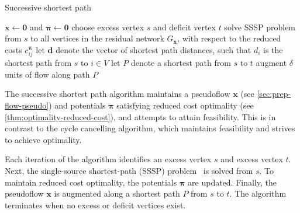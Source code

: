 \begin{algorithm}
    \caption{Successive shortest path}
    \label{algo:successive-shortest-path}
    \begin{algorithmic}[1]
        \State $\mathbf{x} \gets \mathbf{0}$ and $\boldsymbol{\pi} \gets \mathbf{0}$
         \label{algo:successive-shortest-path:start-loop}
          \State choose excess vertex $s$ and deficit vertex $t$\footnotemark \label{algo:successive-shortest-path:select-active}
          \State solve SSSP problem from $s$ to all vertices in the residual network $G_{\mathbf{x}}$, with respect to the reduced costs $c^{\boldsymbol{\pi}}_{ij}$ \label{algo:successive-shortest-path:solve-sssp}
          \State let $\mathbf{d}$ denote the vector of shortest path distances, such that $d_i$ is the shortest path from $s$ to $i\in V$
           \label{algo:successive-shortest-path:update-potentials}
          \State let $P$ denote a shortest path from $s$ to $t$
           \label{algo:successive-shortest-path:compute-delta}
          \State augment $\delta$ units of flow along path $P$ \label{algo:successive-shortest-path:augment-flow}
        \EndWhile \label{algo:successive-shortest-path:end-loop}
    \end{algorithmic}
\end{algorithm}


The successive shortest path algorithm maintains a pseudoflow $\mathbf{x}$ (see \cref{sec:prep-flow-pseudo}) and potentials $\boldsymbol{\pi}$ satisfying reduced cost optimality (see \cref{thm:optimality-reduced-cost}), and attempts to attain feasibility. This is in contrast to the cycle cancelling algorithm, which maintains feasibility and strives to achieve optimality.

Each iteration of the algorithm identifies an excess vertex $s$ and excess vertex $t$. Next, the single-source shortest-path (SSSP) problem~\cite[ch.~24]{CLRS:2009} is solved from $s$. To maintain reduced cost optimality, the potentials $\boldsymbol{\pi}$ are updated. Finally, the pseudoflow $\mathbf{x}$ is augmented along a shortest path $P$ from $s$ to $t$. The algorithm terminates when no excess or deficit vertices exist.

